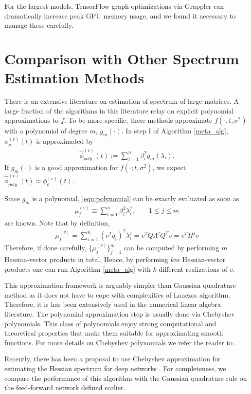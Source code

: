 \documentclass{article}
\newcommand{\phis}{\phi_{\sigma}}
\newcommand{\phisv}{\phis^{(v)}}
\newcommand{\phip}{\widehat{\phi}_{poly}}
\begin{document}
For the largest models, TensorFlow graph optimizations via Grappler can dramatically increase peak GPU memory usage, and we found it necessary to manage these carefully.

\section{Comparison with Other Spectrum Estimation Methods}
\label{app:comparison}
There is an extensive literature on estimation of spectrum of large matrices. A large fraction of the algorithms in this literature relay on explicit polynomial approximations to $f$. To be more specific, these methods approximate $f(\cdot, t, \sigma^2)$ with a polynomial of degree $m$, $g_{m}(\cdot)$. In step I of Algorithm \ref{meta_alg}, $\phisv(t)$ is approximated by
\begin{align}\label{eqn:polynomial}
\phip^{(v)}(t) := \sum_{i = 1}^n \beta_i^2 g_m(\lambda_i).
\end{align}
If $g_m(\cdot)$ is a good approximation for $f(\cdot; t, \sigma^2)$, we expect $\phip^{(v)}(t) \approx \phisv(t)$.

Since $g_m$ is a polynomial, \eqref{eqn:polynomial} can be exactly evaluated as soon as 
\begin{align}
\mu_j^{(v)}\equiv \sum_{i=1}^n \beta_i^2 \lambda_i^j, \qquad 1 \leq j \leq m
\end{align}
are known. Note that by definition, 
\begin{align*}
\mu_j^{(v)} = \sum_{i=1}^n (v^T q_i)^2 \lambda_i^j = v^T Q\Lambda^{j}Q^Tv = v^T H^j v 
\end{align*}
Therefore, if done carefully, $\{\mu_j^{(v)}\}_{j=1}^m$ can be computed by performing $m$ Hessian-vector products in total. Hence, by performing $km$ Hessian-vector products one can run Algorithm \ref{meta_alg} with $k$ different realizations of $v$.


This approximation framework is arguably simpler than Gaussian quadrature method as it does not have to cope with complexities of Lanczos algorithm. Therefore, it is has been extensively used in the numerical linear algebra literature. The polynomial approximation step is usually done via Chebyshev polynomials. This class of polynomials enjoy strong computational and theoretical properties that make them suitable for approximating smooth functions. For more details on Chebyshev polynomials we refer the reader to \cite{gil2007numerical}.

Recently, there has been a proposal to use Chebyshev approximation for estimating the Hessian spectrum for deep networks \cite{adams2018estimating}. For completeness, we compare the performance of this algorithm with the Gaussian quadrature rule on the feed-forward network defined earlier.
\end{document}
